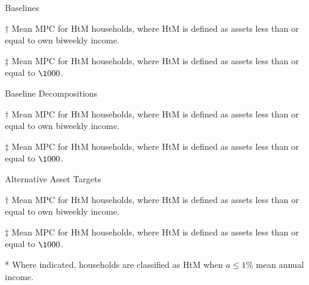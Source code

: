 \documentclass[9pt]{extarticle}
\begin{document}
\begin{table}[h]
\caption{Baselines}
\begin{threeparttable}
\centering


\begin{tablenotes}
	\item[$\dagger$] Mean MPC for HtM households, where HtM is defined as assets less than or equal to own biweekly income.
	\item[$\ddagger$] Mean MPC for HtM households, where HtM is defined as assets less than or equal to $\1000$.
\end{tablenotes}
\end{threeparttable}
\end{table}

\begin{table}[h]
\caption{Baseline Decompositions}
\begin{threeparttable}
\centering


\begin{tablenotes}
	\item[$\dagger$] Mean MPC for HtM households, where HtM is defined as assets less than or equal to own biweekly income.
	\item[$\ddagger$] Mean MPC for HtM households, where HtM is defined as assets less than or equal to $\1000$.
\end{tablenotes}
\end{threeparttable}
\end{table}

\clearpage

\begin{table}[h]
\caption{Alternative Asset Targets}
\begin{threeparttable}
\centering


\begin{tablenotes}
	\item[$\dagger$] Mean MPC for HtM households, where HtM is defined as assets less than or equal to own biweekly income.
	\item[$\ddagger$] Mean MPC for HtM households, where HtM is defined as assets less than or equal to $\1000$.
	\item[*] Where indicated, households are classified as HtM when $a \leq 1\%$ mean annual income.
\end{tablenotes}
\end{threeparttable}
\end{table}
\end{document}
